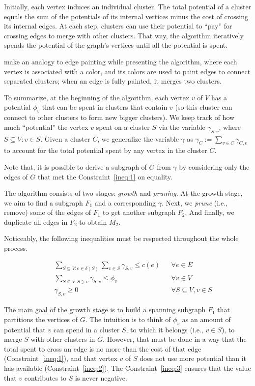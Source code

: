 Initially, each vertex induces an individual cluster. The total potential of a cluster equals the sum of the potentials of its internal vertices minus the cost of crossing its internal edges. At each step, clusters can use their potential to ``pay'' for crossing edges to merge with other clusters. That way, the algorithm iteratively spends the potential of the graph's vertices until all the potential is spent.

\citeauthor{Bateni} make an analogy to edge painting while presenting the algorithm, where each vertex is associated with a color, and its colors are used to paint edges to connect separated clusters; when an edge is fully painted, it merges two clusters.

To summarize, at the beginning of the algorithm, each vertex \(v\) of \(V\) has a potential \(\phi_v\) that can be spent in clusters that contain \(v\) (so this cluster can connect to other clusters to form new bigger clusters). We keep track of how much ``potential'' the vertex \(v\) spent on a cluster \(S\) via the variable \(\gamma_{S, v}\), where \(S \subseteq V: v \in S\). Given a cluster \(C\), we generalize the variable \(\gamma\) as \(\gamma_{C}:= \sum_{v \in C} \gamma_{C, v}\) to account for the total potential spent by any vertex in the cluster \(C\).

Note that, it is possible to derive a subgraph of \(G\) from \(\gamma\) by considering only the edges of \(G\) that met the Constraint~\eqref{ineq:1} on equality.

The algorithm consists of two stages: \textit{growth} and \textit{pruning}. At the growth stage, we aim to find a subgraph \(F_1\) and a corresponding \(\gamma\). Next, we \textit{prune} (i.e., remove) some of the edges of \(F_1\) to get another subgraph \(F_2\). And finally, we duplicate all edges in \(F_2\) to obtain \(M_2\).

Noticeably, the following inequalities must be respected throughout the whole process.

\begin{align}
&&\sum_{S\subseteq V: e \in \delta(S)} \sum_{v \in S} \gamma_{S, v} \leq c(e) && \forall e \in E \label{ineq:1} \\
&&\sum_{S \subseteq V: S \ni v} \gamma_{S, v} \leq \phi_v && \forall v \in V \label{ineq:2} \\
&&\gamma_{S, v} \geq 0 && \forall S \subseteq V, v \in S \label{ineq:3}
\end{align}

The main goal of the growth stage is to build a spanning subgraph \(F_1\) that partitions the vertices of \(G\). The intuition is to think of \(\phi_v\) as an amount of potential that \(v\) can spend in a cluster \(S\), to which it belongs (i.e., \(v \in S\)), to merge \(S\) with other clusters in \(G\). However, that must be done in a way that the total spent to cross an edge is no more than the cost of that edge (Constraint~\eqref{ineq:1}), and that vertex \(v\) of \(S\) does not use more potential than it has available (Constraint~\eqref{ineq:2}). The Constraint~\eqref{ineq:3} ensures that the value that \(v\) contributes to \(S\) is never negative.

